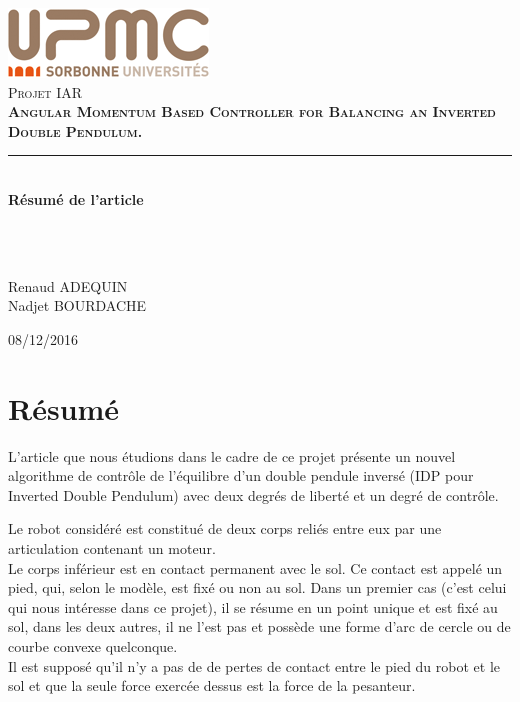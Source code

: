 \documentclass[a4paper,12pt]{report}
\newcommand{\HRule}{\rule{\linewidth}{0.5mm}}
\begin{document}
\begin{titlepage}
  \begin{sffamily}
  \begin{center}
    
    \includegraphics{logo.png}\\[0.5cm]
    
    \textsc{ \huge Projet IAR }\\[4.5cm]


    \textsc{\huge \bfseries Angular Momentum Based Controller for Balancing an Inverted Double Pendulum.}\\[0.5cm]
    \bfseries \HRule \\[0.5cm]
    \huge \bfseries Résumé de l'article

~~\\
~~\\
    \begin{minipage}{0.4\textwidth}
      \begin{center} \large
        Renaud \textsc{ADEQUIN}\\
        Nadjet \textsc{BOURDACHE}\\
      \end{center}
    \end{minipage}

    \vfill

    {\large 08/12/2016}

  \end{center}
  \end{sffamily}
\end{titlepage}

\section*{ Résumé }

L'article que nous étudions dans le cadre de ce projet présente un nouvel algorithme de contrôle de l'équilibre d'un double pendule inversé (IDP pour Inverted Double Pendulum) avec deux degrés de liberté et un degré de contrôle.

Le robot considéré est constitué de deux corps reliés entre eux par une articulation contenant un moteur.\\
Le corps inférieur est en contact permanent avec le sol. Ce contact est appelé un pied, qui, selon le modèle, est fixé ou non au sol. Dans un premier cas (c'est celui qui nous intéresse dans ce projet), il se résume en un point unique et est fixé au sol, dans les deux autres, il ne l'est pas et possède une forme d'arc de cercle ou de courbe convexe quelconque.\\
Il est supposé qu'il n'y a pas de de pertes de contact entre le pied du robot et le sol et que la seule force exercée dessus est la force de la pesanteur.
\end{document}
